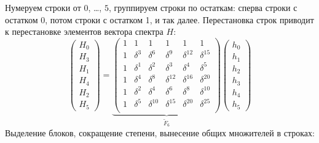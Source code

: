 Нумеруем строки от $0$, \dots, $5$, группируем строки по остаткам: сперва строки с остатком 0, потом строки с остатком 1, и так далее. Перестановка строк приводит к перестановке
элементов вектора спектра $H$:
\[
    \begin{pmatrix}
        H_0 \\
        H_3 \\
        H_1 \\
        H_4 \\
        H_2 \\
        H_5
    \end{pmatrix}
    =
    \underbrace{
        \begin{pmatrix}
            1 & 1        & 1           & 1           & 1           & 1           \\
            1 & \delta^3 & \delta^6    & \delta^9    & \delta^{12} & \delta^{15} \\
            1 & \delta^1 & \delta^2    & \delta^3    & \delta^4    & \delta^5    \\
            1 & \delta^4 & \delta^8    & \delta^{12} & \delta^{16} & \delta^{20} \\
            1 & \delta^2 & \delta^4    & \delta^6    & \delta^8    & \delta^{10} \\
            1 & \delta^5 & \delta^{10} & \delta^{15} & \delta^{20} & \delta^{25} \\
        \end{pmatrix}
    }_{\widetilde{F}_6}
    \begin{pmatrix}
        h_0 \\
        h_1 \\
        h_2 \\
        h_3 \\
        h_4 \\
        h_5
    \end{pmatrix}
\]
Выделение блоков, сокращение степени, вынесение общих множителей в строках:
